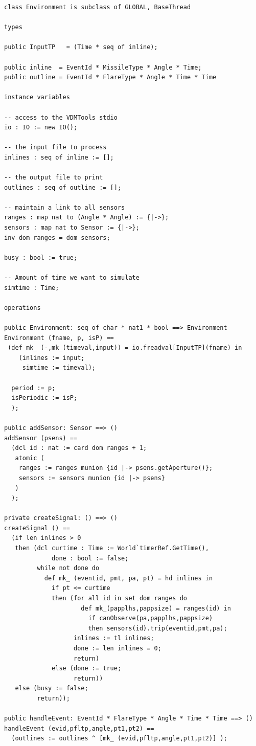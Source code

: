 \documentclass{overturerepchap}
\begin{document}
\begin{lstlisting}
class Environment is subclass of GLOBAL, BaseThread

types

public InputTP   = (Time * seq of inline);

public inline  = EventId * MissileType * Angle * Time;
public outline = EventId * FlareType * Angle * Time * Time

instance variables

-- access to the VDMTools stdio
io : IO := new IO();

-- the input file to process
inlines : seq of inline := [];

-- the output file to print
outlines : seq of outline := [];

-- maintain a link to all sensors
ranges : map nat to (Angle * Angle) := {|->};
sensors : map nat to Sensor := {|->};
inv dom ranges = dom sensors;

busy : bool := true;

-- Amount of time we want to simulate
simtime : Time;

operations

public Environment: seq of char * nat1 * bool ==> Environment
Environment (fname, p, isP) ==
 (def mk_ (-,mk_(timeval,input)) = io.freadval[InputTP](fname) in
    (inlines := input;
     simtime := timeval);
     
  period := p;
  isPeriodic := isP;
  );

public addSensor: Sensor ==> ()
addSensor (psens) ==
  (dcl id : nat := card dom ranges + 1;
   atomic (
    ranges := ranges munion {id |-> psens.getAperture()};
    sensors := sensors munion {id |-> psens} 
   )
  );

private createSignal: () ==> () 
createSignal () ==
  (if len inlines > 0
   then (dcl curtime : Time := World`timerRef.GetTime(), 
             done : bool := false;
         while not done do
           def mk_ (eventid, pmt, pa, pt) = hd inlines in
             if pt <= curtime
             then (for all id in set dom ranges do
                     def mk_(papplhs,pappsize) = ranges(id) in
                       if canObserve(pa,papplhs,pappsize)
                       then sensors(id).trip(eventid,pmt,pa);
                   inlines := tl inlines;
                   done := len inlines = 0;
                   return) 
             else (done := true;
                   return))
   else (busy := false;
         return));

public handleEvent: EventId * FlareType * Angle * Time * Time ==> ()
handleEvent (evid,pfltp,angle,pt1,pt2) ==
  (outlines := outlines ^ [mk_ (evid,pfltp,angle,pt1,pt2)] );


\end{lstlisting}
\end{document}
